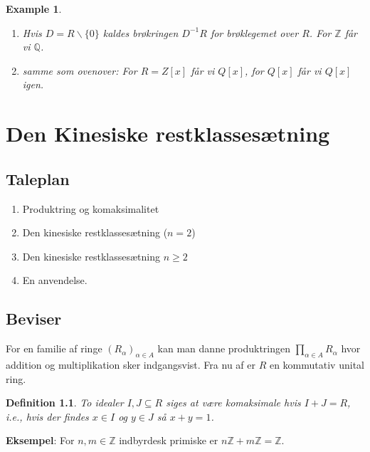 \documentclass[10pt,twoside,openany,final]{memoir}
\theoremstyle{break}
\newtheorem{definition}[section]{Definition}
\theoremstyle{Break}
\newtheorem{example}[section]{Example}
\newcommand{\Z}{\mathbb{Z}}
\newcommand{\Q}{\mathbb{Q}}
\begin{document}
\begin{example}
\begin{enumerate}
\item Hvis $D=R\backslash \{0\}$ kaldes brøkringen $D^{-1}R$ for brøklegemet over $R$. For $\Z$ får vi $\Q$.
\item samme som ovenover: For $R=Z[x]$ får vi $Q[x]$, for $Q[x]$ får vi $Q[x]$ igen.
\end{enumerate}
\end{example}

\chapter{Den Kinesiske restklassesætning}
\section*{Taleplan}
\begin{enumerate}
\item Produktring og komaksimalitet
\item Den kinesiske restklassesætning ($n=2$)
\item Den kinesiske restklassesætning $n \geq 2$
\item En anvendelse. 
\end{enumerate}
\section*{Beviser}
For en familie af ringe $(R_{\alpha})_{\alpha \in A}$ kan man danne produktringen $\prod_{\alpha \in A} R_{\alpha}$ hvor addition og multiplikation sker indgangsvist. Fra nu af er $R$ en kommutativ unital ring.
\begin{definition}
To idealer $I,J \subseteq R$ siges at være komaksimale hvis $I+J=R$, i.e., hvis der findes $x \in I$ og $y \in J$ så $x+y=1$.
\end{definition}
\textbf{Eksempel}: For $n,m \in \Z$ indbyrdesk primiske er $n\Z+m\Z=\Z$.
\end{document}

